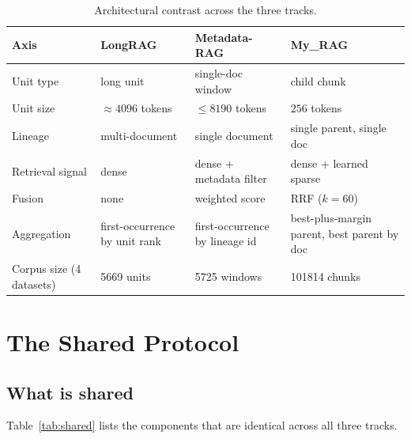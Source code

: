 \documentclass[11pt,a4paper]{article}
\begin{document}
\begin{table}[h]
\centering
\caption{Architectural contrast across the three tracks.}
\label{tab:arch}
\small
\begin{tabular}{p{3.0cm} p{3.8cm} p{3.8cm} p{3.8cm}}
\toprule
\textbf{Axis} & \textbf{LongRAG} & \textbf{Metadata-RAG}
  & \textbf{My\_RAG} \\
\midrule
Unit type & long unit & single-doc window & child chunk \\
Unit size & $\approx\num{4096}$ tokens & $\le\num{8190}$ tokens
  & $\num{256}$ tokens \\
Lineage & multi-document & single document
  & single parent, single doc \\
Retrieval signal & dense & dense + metadata filter
  & dense + learned sparse \\
Fusion & none & weighted score & RRF ($k=60$) \\
Aggregation & first-occurrence by unit rank
  & first-occurrence by lineage id
  & best-plus-margin parent, best parent by doc \\
Corpus size (4 datasets) & \num{5669} units
  & \num{5725} windows & \num{101814} chunks \\
\bottomrule
\end{tabular}
\end{table}

\section{The Shared Protocol}\label{sec:protocol}

\subsection{What is shared}
Table~\ref{tab:shared} lists the components that are identical
across all three tracks.
\end{document}
